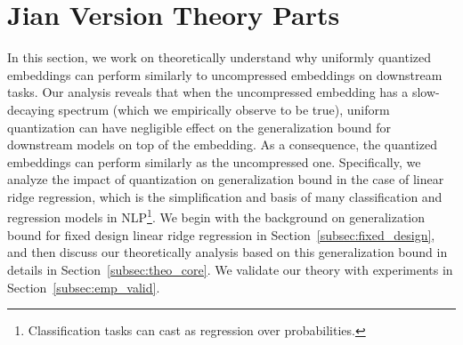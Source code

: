 \section{Jian Version Theory Parts}
In this section, we work on theoretically understand why uniformly quantized embeddings can perform similarly to uncompressed embeddings on downstream tasks.  
Our analysis reveals that when the uncompressed embedding has a slow-decaying spectrum (which we empirically observe to be true), uniform quantization can have negligible effect on the generalization bound for downstream models on top of the embedding. As a consequence, the quantized embeddings can perform similarly as the uncompressed one. 
Specifically, we analyze the impact of quantization on generalization bound in the case of linear ridge regression, which is the simplification and basis of many classification and regression models in NLP\footnote{Classification tasks can cast as regression over probabilities.}. We begin with the background on generalization bound for fixed design linear ridge regression in Section~\ref{subsec:fixed_design}, and then discuss our theoretically analysis based on this generalization bound in details in Section~\ref{subsec:theo_core}. We validate our theory with experiments in Section~\ref{subsec:emp_valid}. 


